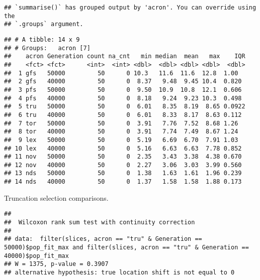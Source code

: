 \documentclass[]{book}
\newenvironment{Shaded}{\begin{snugshade}}{\end{snugshade}}
\newcommand{\DataTypeTok}[1]{\textcolor[rgb]{0.13,0.29,0.53}{#1}}
\newcommand{\DecValTok}[1]{\textcolor[rgb]{0.00,0.00,0.81}{#1}}
\newcommand{\KeywordTok}[1]{\textcolor[rgb]{0.13,0.29,0.53}{\textbf{#1}}}
\newcommand{\NormalTok}[1]{#1}
\newcommand{\OperatorTok}[1]{\textcolor[rgb]{0.81,0.36,0.00}{\textbf{#1}}}
\newcommand{\StringTok}[1]{\textcolor[rgb]{0.31,0.60,0.02}{#1}}
\begin{document}
\begin{verbatim}
## `summarise()` has grouped output by 'acron'. You can override using the
## `.groups` argument.
\end{verbatim}

\begin{verbatim}
## # A tibble: 14 x 9
## # Groups:   acron [7]
##    acron Generation count na_cnt   min median  mean   max    IQR
##    <fct> <fct>      <int>  <int> <dbl>  <dbl> <dbl> <dbl>  <dbl>
##  1 gfs   50000         50      0 10.3   11.6  11.6  12.8  1.00  
##  2 gfs   40000         50      0  8.37   9.48  9.45 10.4  0.820 
##  3 pfs   50000         50      0  9.50  10.9  10.8  12.1  0.606 
##  4 pfs   40000         50      0  8.18   9.24  9.23 10.3  0.498 
##  5 tru   50000         50      0  6.01   8.35  8.19  8.65 0.0922
##  6 tru   40000         50      0  6.01   8.33  8.17  8.63 0.112 
##  7 tor   50000         50      0  3.91   7.76  7.52  8.68 1.26  
##  8 tor   40000         50      0  3.91   7.74  7.49  8.67 1.24  
##  9 lex   50000         50      0  5.19   6.69  6.70  7.91 1.03  
## 10 lex   40000         50      0  5.16   6.63  6.63  7.78 0.852 
## 11 nov   50000         50      0  2.35   3.43  3.38  4.38 0.670 
## 12 nov   40000         50      0  2.27   3.06  3.03  3.99 0.560 
## 13 nds   50000         50      0  1.38   1.63  1.61  1.96 0.239 
## 14 nds   40000         50      0  1.37   1.58  1.58  1.88 0.173
\end{verbatim}

Truncation selection comparisons.

\begin{Shaded}
\end{Shaded}

\begin{verbatim}
## 
##  Wilcoxon rank sum test with continuity correction
## 
## data:  filter(slices, acron == "tru" & Generation == 50000)$pop_fit_max and filter(slices, acron == "tru" & Generation == 40000)$pop_fit_max
## W = 1375, p-value = 0.3907
## alternative hypothesis: true location shift is not equal to 0
\end{verbatim}
\end{document}
